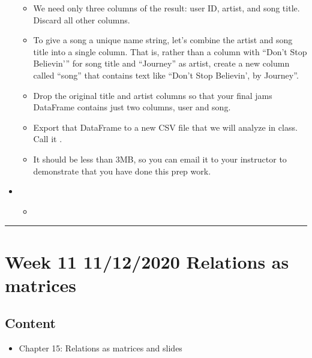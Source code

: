 \documentclass[letterpaper,10pt,english]{sphinxmanual}
\begin{document}
\begin{itemize}
\begin{itemize}
\item {} 
We need only three columns of the result: user ID, artist, and song title.  Discard all other columns.

\item {} 
To give a song a unique name string, let’s combine the artist and song title into a single column.  That is, rather than a column with “Don’t Stop Believin’” for song title and “Journey” as artist, create a new column called “song” that contains text like “Don’t Stop Believin’, by Journey”.

\item {} 
Drop the original title and artist columns so that your final jams DataFrame contains just two columns, user and song.

\item {} 
Export that DataFrame to a new CSV file that we will analyze in class.  Call it .

\item {} 
It should be less than 3MB, so you can email it to your instructor to demonstrate that you have done this prep work.

\end{itemize}

\item {} 
\begin{itemize}
\item {} 
{\hyperref[\detokenize{chapter-16-matrices::doc}]{}}

\end{itemize}

\end{itemize}


\bigskip\hrule\bigskip



\section{Week 11 \sphinxhyphen{} 11/12/2020 \sphinxhyphen{} Relations as matrices}
\label{\detokenize{course-schedule:week-11-11-12-2020-relations-as-matrices}}

\subsection{Content}
\label{\detokenize{course-schedule:id19}}\begin{itemize}
\item {} 
Chapter 15: Relations as matrices \sphinxhyphen{} {\hyperref[\detokenize{chapter-16-matrices::doc}]{}} and slides

\end{itemize}
\end{document}

